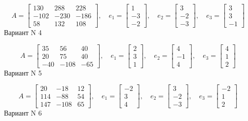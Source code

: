 \documentclass[11pt]{report}
\begin{document}
$$A = \left[\begin{matrix}130 & 288 & 228\\-102 & -230 & -186\\58 & 132 & 108\end{matrix}\right],\quad e_1 = \left[\begin{matrix}1\\-3\\-2\end{matrix}\right],\quad e_2 = \left[\begin{matrix}3\\-2\\-3\end{matrix}\right],\quad e_3 = \left[\begin{matrix}3\\3\\-1\end{matrix}\right]$$Вариант N 4

$$A = \left[\begin{matrix}35 & 56 & 40\\20 & 75 & 40\\-40 & -108 & -65\end{matrix}\right],\quad e_1 = \left[\begin{matrix}2\\3\\1\end{matrix}\right],\quad e_2 = \left[\begin{matrix}4\\-1\\4\end{matrix}\right],\quad e_3 = \left[\begin{matrix}4\\1\\2\end{matrix}\right]$$Вариант N 5

$$A = \left[\begin{matrix}20 & -18 & 12\\114 & -88 & 54\\147 & -108 & 65\end{matrix}\right],\quad e_1 = \left[\begin{matrix}-2\\3\\4\end{matrix}\right],\quad e_2 = \left[\begin{matrix}3\\-2\\-3\end{matrix}\right],\quad e_3 = \left[\begin{matrix}-2\\1\\2\end{matrix}\right]$$Вариант N 6
\end{document}
